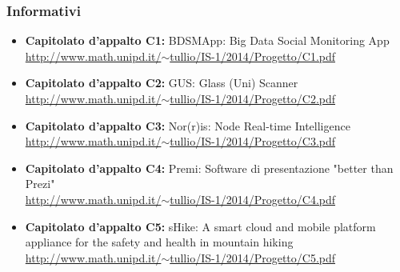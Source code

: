 \subsubsection{Informativi}
\begin{itemize}
	\item \textbf{Capitolato d’appalto C1:} BDSMApp: Big Data Social Monitoring App \\ \href{http://www.math.unipd.it/~tullio/IS-1/2014/Progetto/C1.pdf}{http://www.math.unipd.it/$\sim$tullio/IS-1/2014/Progetto/C1.pdf}
	\item \textbf{Capitolato d’appalto C2:} GUS: Glass (Uni) Scanner\\ \href{http://www.math.unipd.it/~tullio/IS-1/2014/Progetto/C2.pdf}{http://www.math.unipd.it/$\sim$tullio/IS-1/2014/Progetto/C2.pdf}
	\item \textbf{Capitolato d’appalto C3:} Nor(r)is: Node Real-time Intelligence \\ \href{http://www.math.unipd.it/~tullio/IS-1/2014/Progetto/C3.pdf}{http://www.math.unipd.it/$\sim$tullio/IS-1/2014/Progetto/C3.pdf}
	\item \textbf{Capitolato d’appalto C4:} Premi: Software di presentazione "better than Prezi"\\ \href{http://www.math.unipd.it/~tullio/IS-1/2014/Progetto/C4.pdf}{http://www.math.unipd.it/$\sim$tullio/IS-1/2014/Progetto/C4.pdf}
	\item \textbf{Capitolato d’appalto C5:} 
	sHike: A smart cloud and mobile platform appliance for the safety and health in mountain hiking\\ \href{http://www.math.unipd.it/~tullio/IS-1/2014/Progetto/C5.pdf}{http://www.math.unipd.it/$\sim$tullio/IS-1/2014/Progetto/C5.pdf}
\end{itemize}